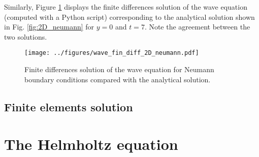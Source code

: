 \documentclass[11pt]{article}
\begin{document}
Similarly, Figure \ref{fig:2D_fd_neumann} displays the finite differences solution of the wave equation (computed with a Python script) corresponding to the analytical solution shown in Fig. \ref{fig:2D_neumann} for $y=0$ and $t=7$. Note the agreement between the two solutions.
\begin{figure}[h]
  \centering
    \texttt{[image: ../figures/wave\_fin\_diff\_2D\_neumann.pdf]} 
  \caption{\label{fig:2D_fd_neumann} Finite differences solution of the wave equation for Neumann boundary conditions compared with the analytical solution.}
\end{figure}


\subsection{Finite elements solution}

\section{The Helmholtz equation}
\end{document}
